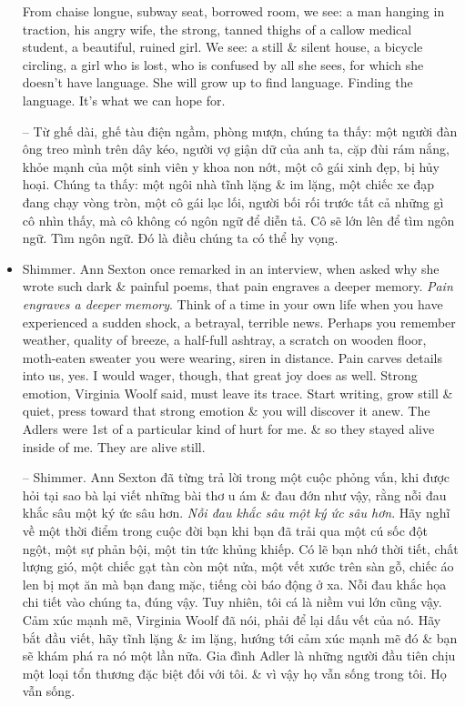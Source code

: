 \documentclass{article}
\begin{document}
\begin{itemize}
	From chaise longue, subway seat, borrowed room, we see: a man hanging in traction, his angry wife, the strong, tanned thighs of a callow medical student, a beautiful, ruined girl. We see: a still \& silent house, a bicycle circling, a girl who is lost, who is confused by all she sees, for which she doesn't have language. She will grow up to find language. Finding the language. It's what we can hope for.
	
	-- Từ ghế dài, ghế tàu điện ngầm, phòng mượn, chúng ta thấy: một người đàn ông treo mình trên dây kéo, người vợ giận dữ của anh ta, cặp đùi rám nắng, khỏe mạnh của một sinh viên y khoa non nớt, một cô gái xinh đẹp, bị hủy hoại. Chúng ta thấy: một ngôi nhà tĩnh lặng \& im lặng, một chiếc xe đạp đang chạy vòng tròn, một cô gái lạc lối, người bối rối trước tất cả những gì cô nhìn thấy, mà cô không có ngôn ngữ để diễn tả. Cô sẽ lớn lên để tìm ngôn ngữ. Tìm ngôn ngữ. Đó là điều chúng ta có thể hy vọng.
	\item {\sf Shimmer.} {\sc Ann Sexton} once remarked in an interview, when asked why she wrote such dark \& painful poems, that pain engraves a deeper memory. {\it Pain engraves a deeper memory}. Think of a time in your own life when you have experienced a sudden shock, a betrayal, terrible news. Perhaps you remember weather, quality of breeze, a half-full ashtray, a scratch on wooden floor, moth-eaten sweater you were wearing, siren in distance. Pain carves details into us, yes. I would wager, though, that great joy does as well. Strong emotion, {\sc Virginia Woolf} said, must leave its trace. Start writing, grow still \& quiet, press toward that strong emotion \& you will discover it anew. The Adlers were 1st of a particular kind of hurt for me. \& so they stayed alive inside of me. They are alive still.
	
	-- {\sf Shimmer.} {\sc Ann Sexton} đã từng trả lời trong một cuộc phỏng vấn, khi được hỏi tại sao bà lại viết những bài thơ u ám \& đau đớn như vậy, rằng nỗi đau khắc sâu một ký ức sâu hơn. {\it Nỗi đau khắc sâu một ký ức sâu hơn}. Hãy nghĩ về một thời điểm trong cuộc đời bạn khi bạn đã trải qua một cú sốc đột ngột, một sự phản bội, một tin tức khủng khiếp. Có lẽ bạn nhớ thời tiết, chất lượng gió, một chiếc gạt tàn còn một nửa, một vết xước trên sàn gỗ, chiếc áo len bị mọt ăn mà bạn đang mặc, tiếng còi báo động ở xa. Nỗi đau khắc họa chi tiết vào chúng ta, đúng vậy. Tuy nhiên, tôi cá là niềm vui lớn cũng vậy. Cảm xúc mạnh mẽ, {\sc Virginia Woolf} đã nói, phải để lại dấu vết của nó. Hãy bắt đầu viết, hãy tĩnh lặng \& im lặng, hướng tới cảm xúc mạnh mẽ đó \& bạn sẽ khám phá ra nó một lần nữa. Gia đình Adler là những người đầu tiên chịu một loại tổn thương đặc biệt đối với tôi. \& vì vậy họ vẫn sống trong tôi. Họ vẫn sống.
	

\end{itemize}
\end{document}
